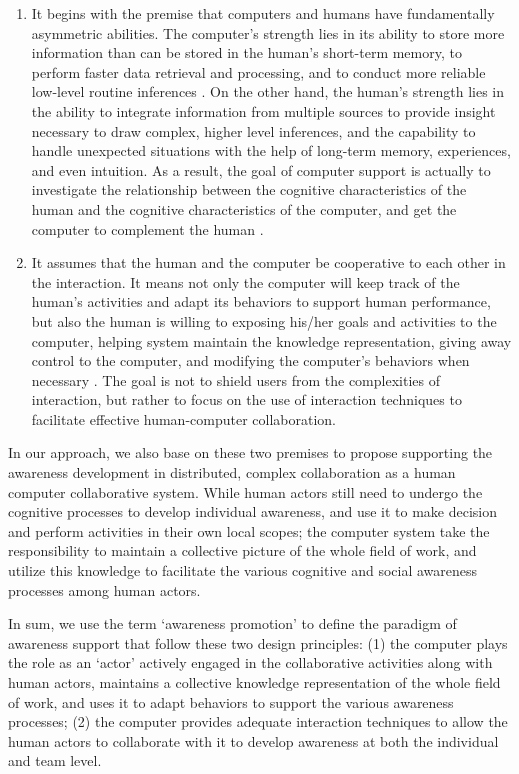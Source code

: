 \begin{enumerate}
   \item It begins with the premise that computers and humans have fundamentally asymmetric abilities. The computer's strength lies in its ability to store more information than can be stored in the human's short-term memory, to perform faster data retrieval and processing, and to conduct more reliable low-level routine inferences \cite{Brown99activeuser}. On the other hand, the human's strength lies in the ability to integrate information from multiple sources to provide insight necessary to draw complex, higher level inferences, and the capability to handle unexpected situations with the help of long-term memory, experiences, and even intuition. As a result, the goal of computer support is actually to investigate the relationship between the cognitive characteristics of the human and the cognitive characteristics of the computer, and get the computer to complement the human \cite{Dalal1994}.
   \item It assumes that the human and the computer be cooperative to each other in the interaction. It means not only the computer will keep track of the human's activities and adapt its behaviors to support human performance, but also the human is willing to exposing his/her goals and activities to the computer, helping system maintain the knowledge representation, giving away control to the computer, and modifying the computer's behaviors when necessary \cite{Terveen1995}. The goal is not to shield users from the complexities of interaction, but rather to focus on the use of interaction techniques to facilitate effective human-computer collaboration.
\end{enumerate}

In our approach, we also base on these two premises to propose supporting the awareness development in distributed, complex collaboration as a human computer collaborative system. While human actors still need to undergo the cognitive processes to develop individual awareness, and use it to make decision and perform activities in their own local scopes; the computer system take the responsibility to maintain a collective picture of the whole field of work, and utilize this knowledge to facilitate the various cognitive and social awareness processes among human actors.

In sum, we use the term `awareness promotion' to define the paradigm of awareness support that follow these two design principles: (1) the computer plays the role as an `actor' actively engaged in the collaborative activities along with human actors, maintains a collective knowledge representation of the whole field of work, and uses it to adapt behaviors to support the various awareness processes; (2) the computer provides adequate interaction techniques to allow the human actors to collaborate with it to develop awareness at both the individual and team level. 

